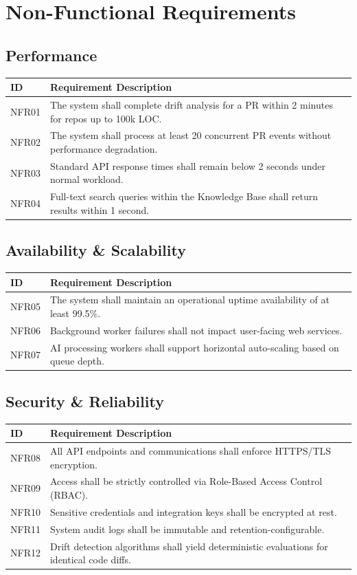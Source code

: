\section{Non-Functional Requirements}

\subsection{Performance}
\begin{longtable}{p{2cm} p{11.3cm}}
	\toprule
	\textbf{ID} & \textbf{Requirement Description} \\
	\midrule
	\endhead
	NFR01 & The system shall complete drift analysis for a PR within 2 minutes for repos up to 100k LOC. \\
	NFR02 & The system shall process at least 20 concurrent PR events without performance degradation. \\
	NFR03 & Standard API response times shall remain below 2 seconds under normal workload. \\
	NFR04 & Full-text search queries within the Knowledge Base shall return results within 1 second. \\
	\bottomrule
\end{longtable}

\subsection{Availability \& Scalability}
\begin{longtable}{p{2cm} p{11.3cm}}
	\toprule
	\textbf{ID} & \textbf{Requirement Description} \\
	\midrule
	\endhead
	NFR05 & The system shall maintain an operational uptime availability of at least 99.5\%. \\
	NFR06 & Background worker failures shall not impact user-facing web services. \\
	NFR07 & AI processing workers shall support horizontal auto-scaling based on queue depth. \\
	\bottomrule
\end{longtable}

\subsection{Security \& Reliability}
\begin{longtable}{p{2cm} p{11.3cm}}
	\toprule
	\textbf{ID} & \textbf{Requirement Description} \\
	\midrule
	\endhead
	NFR08 & All API endpoints and communications shall enforce HTTPS/TLS encryption. \\
	NFR09 & Access shall be strictly controlled via Role-Based Access Control (RBAC). \\
	NFR10 & Sensitive credentials and integration keys shall be encrypted at rest. \\
	NFR11 & System audit logs shall be immutable and retention-configurable. \\
	NFR12 & Drift detection algorithms shall yield deterministic evaluations for identical code diffs. \\
	\bottomrule
\end{longtable}

